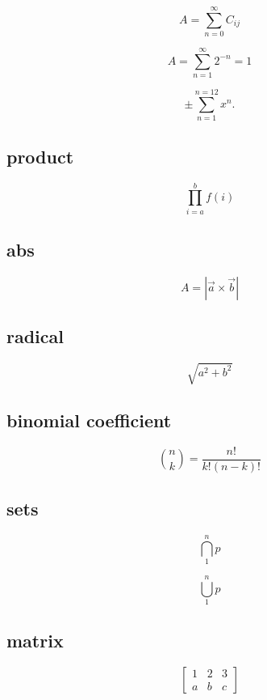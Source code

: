 \documentclass{article}
\begin{document}
$$A=\sum_{n=0}^\infty C_{ij}$$

$$A={\sum_{n=1}^\infty 2^{-n}} = 1$$

$$ \pm\sum_{n=1}^{n=12} x^n.$$

\subsection{product}

$$ \prod_{i=a}^{b} f(i) $$	

\subsection{abs}

$$A=|\vec{a}\times \vec{b}|$$

\subsection{radical}

$$\sqrt{a^2+b^2}$$

\subsection{binomial coefficient}

$$\binom{n}{k} = \frac{n!}{k!(n-k)!}$$

\subsection{sets}

$$\bigcap_1^{n} p$$

$$\bigcup_1^{n} p$$

\subsection{matrix}

$$\begin{bmatrix}
    1 & 2 & 3\\
    a & b & c
\end{bmatrix}$$
\end{document}
